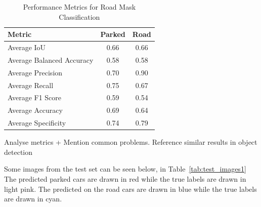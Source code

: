 \begin{table}[h]
    \centering
    \begin{tabular}{|l|c|c|}
    \hline
    \textbf{Metric}               & \textbf{Parked} & \textbf{Road} \\ \hline
    Average IoU                  & 0.66         & 0.66              \\ \hline
    Average Balanced Accuracy    & 0.58         & 0.58              \\ \hline
    Average Precision            & 0.70         & 0.90              \\ \hline
    Average Recall               & 0.75         & 0.67              \\ \hline
    Average F1 Score             & 0.59         & 0.54              \\ \hline
    Average Accuracy             & 0.69         & 0.64              \\ \hline
    Average Specificity          & 0.74         & 0.79              \\ \hline
    \end{tabular}
    \caption{Performance Metrics for Road Mask Classification}
    \label{tab:metrics1}
\end{table}

Analyse metrics + Mention common problems. Reference similar results in object detection

Some images from the test set can be seen below, in Table~\ref{tab:test_images1}
The predicted parked cars are drawn in red while the true labels are drawn in light pink. The predicted on the road cars are drawn in blue while the true labels are drawn in cyan.

